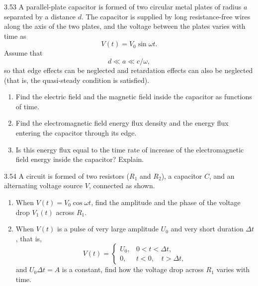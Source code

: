 \begin{problem}{3.53}
A parallel-plate capacitor is formed of two circular metal plates of radius $a$ separated by a distance $d$. The capacitor is supplied by long resistance-free wires along the axis of the two plates, and the voltage between the plates varies with time as
\begin{equation*}
V(t)=V_0\sin\omega t.
\end{equation*}
Assume that
\begin{equation*}
d\ll a\ll c/\omega,
\end{equation*}
so that edge effects can be neglected and retardation effects can also be neglected (that is, the quasi-steady condition is satisfied).
\begin{enumerate}[label=(\arabic*),leftmargin=2.2em,itemsep=1pt,topsep=2pt]
\item Find the electric field and the magnetic field inside the capacitor as functions of time.
\item Find the electromagnetic field energy flux density and the energy flux entering the capacitor through its edge.
\item Is this energy flux equal to the time rate of increase of the electromagnetic field energy inside the capacitor? Explain.
\end{enumerate}
\end{problem}

\begin{problem}{3.54}
A circuit is formed of two resistors ($R_1$ and $R_2$), a capacitor $C$, and an alternating voltage source $V$, connected as shown.
\begin{enumerate}[label=(\arabic*),leftmargin=2.2em,itemsep=1pt,topsep=2pt]
\item When $V(t)=V_0\cos\omega t$, find the amplitude and the phase of the voltage drop $V_1(t)$ across $R_1$.
\item When $V(t)$ is a pulse of very large amplitude $U_0$ and very short duration $\Delta t$, that is,
\begin{equation*}
V(t)=
\begin{cases}
U_0, & 0<t<\Delta t,\\
0, & t<0,\quad t>\Delta t,
\end{cases}
\end{equation*}
and $U_0\Delta t=A$ is a constant, find how the voltage drop across $R_1$ varies with time.
\end{enumerate}
\end{problem}


